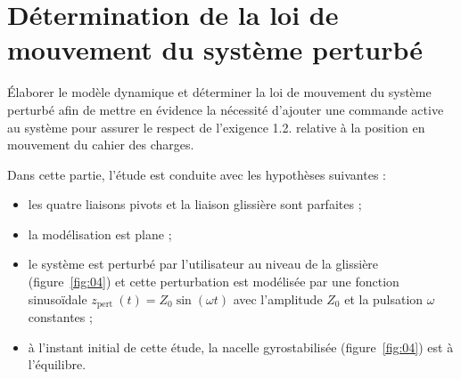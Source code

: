 \section{\label{part:3}Détermination de la loi de mouvement du système perturbé }
\begin{obj}
Élaborer le modèle dynamique et déterminer la loi de mouvement du système perturbé afin de mettre en évidence la nécessité d'ajouter une commande active au système pour assurer le respect de l'exigence 1.2. relative à la position en mouvement du cahier des charges.
\end{obj}

\ifprof
\else
Dans cette partie, l'étude est conduite avec les hypothèses suivantes :

\begin{itemize}
  \item les quatre liaisons pivots et la liaison glissière sont parfaites ;
  \item la modélisation est plane ;
  \item le système est perturbé par l'utilisateur au niveau de la glissière (figure~\ref{fig:04}) et cette perturbation est modélisée par une fonction sinusoïdale $z_{\text {pert }}(t)=Z_{0} \sin (\omega t)$ avec l'amplitude $Z_{0}$ et la pulsation $\omega$ constantes ;
  \item à l'instant initial de cette étude, la nacelle gyrostabilisée (figure~\ref{fig:04}) est à l'équilibre.
\end{itemize}
\fi

